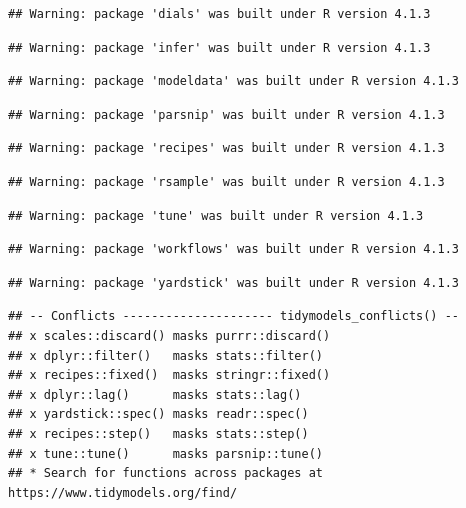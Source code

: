 \documentclass[
]{book}
\begin{document}
\begin{verbatim}
## Warning: package 'dials' was built under R version 4.1.3
\end{verbatim}

\begin{verbatim}
## Warning: package 'infer' was built under R version 4.1.3
\end{verbatim}

\begin{verbatim}
## Warning: package 'modeldata' was built under R version 4.1.3
\end{verbatim}

\begin{verbatim}
## Warning: package 'parsnip' was built under R version 4.1.3
\end{verbatim}

\begin{verbatim}
## Warning: package 'recipes' was built under R version 4.1.3
\end{verbatim}

\begin{verbatim}
## Warning: package 'rsample' was built under R version 4.1.3
\end{verbatim}

\begin{verbatim}
## Warning: package 'tune' was built under R version 4.1.3
\end{verbatim}

\begin{verbatim}
## Warning: package 'workflows' was built under R version 4.1.3
\end{verbatim}

\begin{verbatim}
## Warning: package 'yardstick' was built under R version 4.1.3
\end{verbatim}

\begin{verbatim}
## -- Conflicts --------------------- tidymodels_conflicts() --
## x scales::discard() masks purrr::discard()
## x dplyr::filter()   masks stats::filter()
## x recipes::fixed()  masks stringr::fixed()
## x dplyr::lag()      masks stats::lag()
## x yardstick::spec() masks readr::spec()
## x recipes::step()   masks stats::step()
## x tune::tune()      masks parsnip::tune()
## * Search for functions across packages at https://www.tidymodels.org/find/
\end{verbatim}
\end{document}
